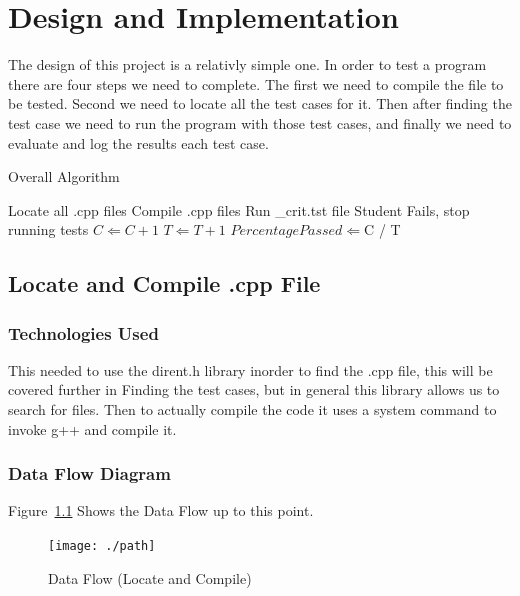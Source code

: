 \chapter{Design  and Implementation}
The design of this project is a relativly simple one.  In order to test a program there are four steps we need to complete.
The first we need to compile the file to be tested.  Second we need to locate all the test cases for it.  Then after finding the test case we need to run the program with those test cases, and finally we need to evaluate and log the results each test case.

\begin{algorithm} [tbh]              %
\caption{Overall Algorithm}
\label{algover}
\begin{algorithmic}
	\STATE Locate all .cpp files
	\STATE Compile .cpp files
		\STATE Run \_crit.tst file
				\STATE Student Fails, stop running tests
			\ENDIF
		\ENDIF
	\ENDWHILE
			\STATE $C \Leftarrow C + 1$
		\ENDIF
		\STATE $T \Leftarrow T + 1$
	\ENDWHILE
	\STATE $Percentage Passed \Leftarrow $C / T
\end{algorithmic}
\end{algorithm}
 

\section{Locate and Compile .cpp File}

\subsection{Technologies  Used}
This needed to use the dirent.h library inorder to find the .cpp file, this will be covered further in
Finding the test cases, but in general this library allows us to search for files.  Then to actually compile
the code it uses a system command to invoke g++ and compile it.

\subsection{Data Flow Diagram}
Figure~\ref{DataFlow1} Shows the Data Flow up to this point.

\begin{figure}[tbh]
\begin{center}
\texttt{[image: ./path]}
\end{center}
\caption{Data Flow (Locate and Compile) \label{DataFlow1}}
\end{figure}


